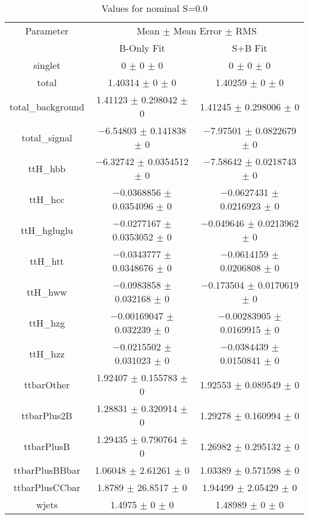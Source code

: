 \begin{table}
\centering
\caption{Values for nominal S=0.0}
\begin{tabular}{ccc}
\toprule
Parameter & \multicolumn{2}{c}{Mean $\pm$ Mean Error $\pm$ RMS}\\
 & B-Only Fit & S+B Fit\\
\midrule
singlet & \num{0} $\pm$ \num{0} $\pm$ \num{0} & \num{0} $\pm$ \num{0} $\pm$ \num{0}\\
total & \num{1.40314} $\pm$ \num{0} $\pm$ \num{0} & \num{1.40259} $\pm$ \num{0} $\pm$ \num{0}\\
total\_background & \num{1.41123} $\pm$ \num{0.298042} $\pm$ \num{0} & \num{1.41245} $\pm$ \num{0.298006} $\pm$ \num{0}\\
total\_signal & \num{-6.54803} $\pm$ \num{0.141838} $\pm$ \num{0} & \num{-7.97501} $\pm$ \num{0.0822679} $\pm$ \num{0}\\
ttH\_hbb & \num{-6.32742} $\pm$ \num{0.0354512} $\pm$ \num{0} & \num{-7.58642} $\pm$ \num{0.0218743} $\pm$ \num{0}\\
ttH\_hcc & \num{-0.0368856} $\pm$ \num{0.0354096} $\pm$ \num{0} & \num{-0.0627431} $\pm$ \num{0.0216923} $\pm$ \num{0}\\
ttH\_hgluglu & \num{-0.0277167} $\pm$ \num{0.0353052} $\pm$ \num{0} & \num{-0.049646} $\pm$ \num{0.0213962} $\pm$ \num{0}\\
ttH\_htt & \num{-0.0343777} $\pm$ \num{0.0348676} $\pm$ \num{0} & \num{-0.0614159} $\pm$ \num{0.0206808} $\pm$ \num{0}\\
ttH\_hww & \num{-0.0983858} $\pm$ \num{0.032168} $\pm$ \num{0} & \num{-0.173504} $\pm$ \num{0.0170619} $\pm$ \num{0}\\
ttH\_hzg & \num{-0.00169047} $\pm$ \num{0.032239} $\pm$ \num{0} & \num{-0.00283905} $\pm$ \num{0.0169915} $\pm$ \num{0}\\
ttH\_hzz & \num{-0.0215502} $\pm$ \num{0.031023} $\pm$ \num{0} & \num{-0.0384439} $\pm$ \num{0.0150841} $\pm$ \num{0}\\
ttbarOther & \num{1.92407} $\pm$ \num{0.155783} $\pm$ \num{0} & \num{1.92553} $\pm$ \num{0.089549} $\pm$ \num{0}\\
ttbarPlus2B & \num{1.28831} $\pm$ \num{0.320914} $\pm$ \num{0} & \num{1.29278} $\pm$ \num{0.160994} $\pm$ \num{0}\\
ttbarPlusB & \num{1.29435} $\pm$ \num{0.790764} $\pm$ \num{0} & \num{1.26982} $\pm$ \num{0.295132} $\pm$ \num{0}\\
ttbarPlusBBbar & \num{1.06048} $\pm$ \num{2.61261} $\pm$ \num{0} & \num{1.03389} $\pm$ \num{0.571598} $\pm$ \num{0}\\
ttbarPlusCCbar & \num{1.8789} $\pm$ \num{26.8517} $\pm$ \num{0} & \num{1.94499} $\pm$ \num{2.05429} $\pm$ \num{0}\\
wjets & \num{1.4975} $\pm$ \num{0} $\pm$ \num{0} & \num{1.48989} $\pm$ \num{0} $\pm$ \num{0}\\
\bottomrule
\end{tabular}
\end{table}
